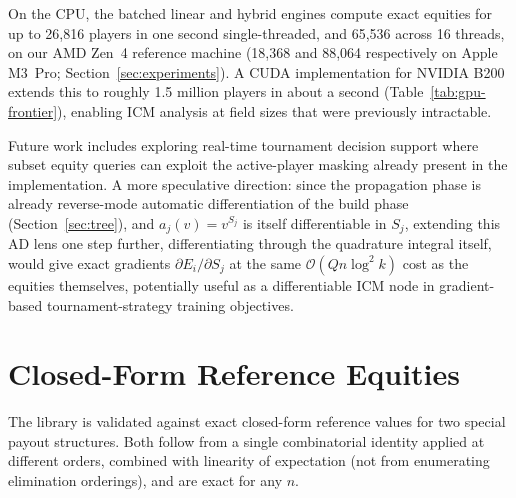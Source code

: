 \documentclass[11pt]{article}
\newcommand{\bigO}{\mathcal{O}}
\begin{document}
On the CPU, the batched linear and hybrid engines compute exact equities
for up to 26,816 players in one second single-threaded, and 65,536 across
16 threads, on our AMD Zen~4 reference machine (18,368 and 88,064
respectively on Apple M3~Pro; Section~\ref{sec:experiments}). A CUDA
implementation for NVIDIA B200
extends this to roughly 1.5 million players in about a second
(Table~\ref{tab:gpu-frontier}), enabling
ICM analysis at field sizes that were previously intractable.

Future work includes exploring real-time tournament decision support where
subset equity queries can exploit the active-player masking already present
in the implementation. A more speculative direction: since the propagation
phase is already reverse-mode automatic differentiation of the build phase
(Section~\ref{sec:tree}), and $a_j(v) = v^{S_j}$ is itself differentiable
in $S_j$, extending this AD lens one step further, differentiating through
the quadrature integral itself, would give exact gradients
$\partial E_i / \partial S_j$ at the same $\bigO(Qn\log^2 k)$ cost as the
equities themselves, potentially useful as a differentiable ICM node in
gradient-based tournament-strategy training objectives.


\appendix
\section{Closed-Form Reference Equities}\label{sec:appendix}

The library is validated against exact closed-form reference values for two
special payout structures. Both follow from a single combinatorial identity
applied at different orders, combined with linearity of expectation (not
from enumerating elimination orderings), and are exact for any $n$.
\end{document}
